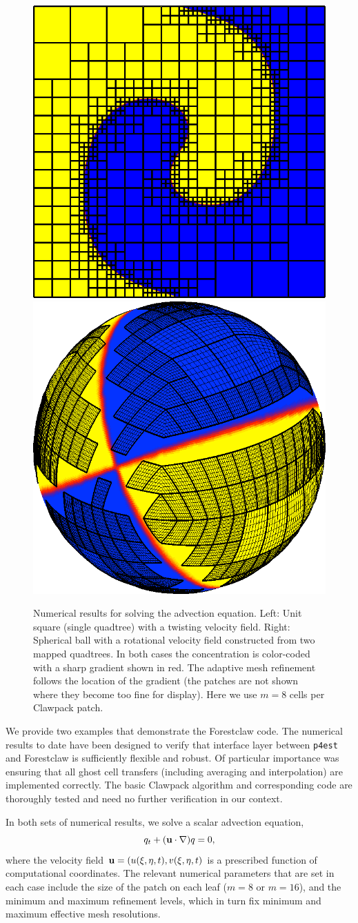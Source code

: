 \documentclass{IOS-Book-Article}     %
\newcommand{\clawpack}{{\sc Clawpack}\xspace}
\newcommand{\forestclaw}{Forestclaw\xspace}
\newcommand{\pforest}{\texttt{p4est}\xspace}
\newcommand{\plotbox}[1]{#1}
\begin{document}
\begin{figure}
\begin{center}
\plotbox{\includegraphics[width=.4\columnwidth]{quadtree}}
\hspace{.05\columnwidth}
\plotbox{\includegraphics[width=.4\columnwidth]{sphere_plot167}}
\end{center}
\caption{Numerical results for solving the advection equation.  Left:  Unit
square (single quadtree) with a twisting velocity field.  Right: Spherical ball
with a rotational velocity field constructed from two mapped quadtrees.  In
both cases the concentration is color-coded with a sharp gradient shown in red.
The adaptive mesh refinement follows the location of the gradient (the patches
are not shown where they become too fine for display).  Here we use $m = 8$
cells per \clawpack patch.}
\label{fig:results2d}
\end{figure}

We provide two examples that demonstrate the \forestclaw code.
The numerical results to date have been designed to verify that
interface layer between \pforest and \forestclaw is sufficiently
flexible and robust.  Of particular importance was ensuring that all
ghost cell transfers (including averaging and
interpolation) are implemented correctly.
The basic \clawpack algorithm and corresponding code are
thoroughly tested and need no further verification in our context.

In both sets of numerical results, we solve a scalar advection
equation,
\begin{equation}
q_t + ({\bf u}\cdot \nabla) q = 0 ,
\end{equation}
where the velocity field ${\bf u} = (u(\xi,\eta,t), v(\xi,\eta,t)$ is
a prescribed function of computational coordinates.  The relevant
numerical parameters that are set in each case include the size of the
patch on each leaf ($m=8$ or $m=16$), and the minimum and maximum
refinement levels, which in turn fix minimum and maximum effective mesh
resolutions.
\end{document}
